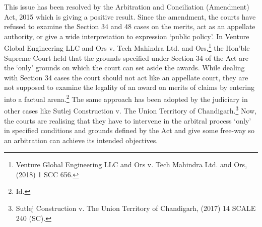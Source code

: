 \begin{multicols}{2}
\noi
This issue has been resolved by the Arbitration and Conciliation (Amendment) Act, 2015
which is giving a positive result. Since the amendment, the courts have refused to examine the
Section 34 and 48 cases on the merits, act as an appellate authority, or give a wide
interpretation to expression ‘public policy’. In Venture Global Engineering LLC and Ors v.
Tech Mahindra Ltd. and Ors,\footnote{Venture Global Engineering LLC and Ors v. Tech Mahindra Ltd. and Ors, (2018) 1 SCC 656.} the Hon’ble Supreme Court held that the grounds specified
under Section 34 of the Act are the ‘only’ grounds on which the court can set aside the awards.
While dealing with Section 34 cases the court should not act like an appellate court, they are
not supposed to examine the legality of an award on merits of claims by entering into a factual
arena.\footnote{Id.} The same approach has been adopted by the judiciary in other cases like Sutlej
Construction v. The Union Territory of Chandigarh.\footnote{Sutlej Construction v. The Union Territory of Chandigarh, (2017) 14 SCALE 240 (SC).} Now, the courts are realising that they
have to intervene in the arbitral process ‘only’ in specified conditions and grounds defined by
the Act and give some free-way so an arbitration can achieve its intended objectives.
\end{multicols}
\label{end2018-art6}
